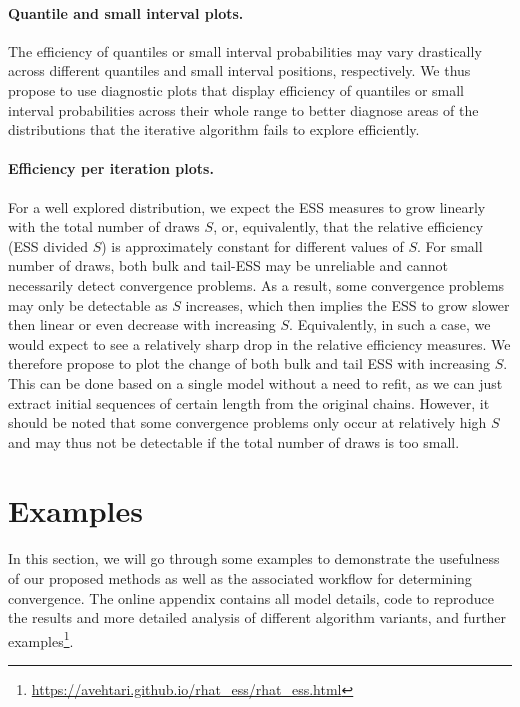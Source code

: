 \documentclass[american,]{article}
\let\oldparagraph\paragraph
\renewcommand{\paragraph}[1]{\oldparagraph{#1}\mbox{}}
\let\rmarkdownfootnote\footnote%
\def\footnote{\protect\rmarkdownfootnote}
\begin{document}
\hypertarget{quantile-and-small-interval-plots}{%
\paragraph{Quantile and small interval
plots.}\label{quantile-and-small-interval-plots}}
The efficiency of quantiles or small interval probabilities may vary
drastically across different quantiles and small interval positions,
respectively. We thus propose to use diagnostic plots that display
efficiency of quantiles or small interval probabilities across their
whole range to better diagnose areas of the distributions that the
iterative algorithm fails to explore efficiently.

\hypertarget{efficiency-change-plots}{%
\paragraph{Efficiency per iteration plots.}\label{efficiency-change-plots}}
For a well explored distribution, we expect the ESS measures to grow
linearly with the total number of draws \(S\), or, equivalently, that
the relative efficiency (ESS divided \(S\)) is approximately constant
for different values of \(S\). For small number of draws, both bulk and
tail-ESS may be unreliable and cannot necessarily detect convergence
problems. As a result, some convergence problems may only be
detectable as \(S\) increases, which then implies the ESS to grow slower
then linear or even decrease with increasing \(S\). Equivalently, in
such a case, we would expect to see a relatively sharp drop in the
relative efficiency measures. We therefore propose to plot the change of
both bulk and tail ESS with increasing \(S\). This can be done based on
a single model without a need to refit, as we can just extract initial
sequences of certain length from the original chains. However, it should
be noted that some convergence problems only occur at relatively high
\(S\) and may thus not be detectable if the total number of draws is too
small.

\hypertarget{examples}{%
\section{Examples}\label{examples}}

In this section, we will go through some examples to demonstrate the
usefulness of our proposed methods as well as the associated workflow
for determining convergence. The online appendix contains all model
details, code to reproduce the results and more detailed analysis of
different algorithm variants, and further
examples\footnote{\url{https://avehtari.github.io/rhat_ess/rhat_ess.html}}.
\end{document}
